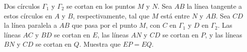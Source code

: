 Dos círculos $\Gamma_1$ y $\Gamma_2$ se cortan en los puntos $M$ y $N$. Sea $AB$ la línea tangente a estos círculos en $A$ y $B$, respectivamente, tal que $M$ está entre $N$ y $AB$. Sea $CD$ la línea paralela a $AB$ que pasa por el punto $M$, con $C$ en $\Gamma_1$ y $D$ en $\Gamma_2$. Las líneas $AC$ y $BD$ se cortan en $E$, las líneas $AN$ y $CD$ se cortan en $P$, y las líneas $BN$ y $CD$ se cortan en $Q$. Muestra que $EP=EQ$.